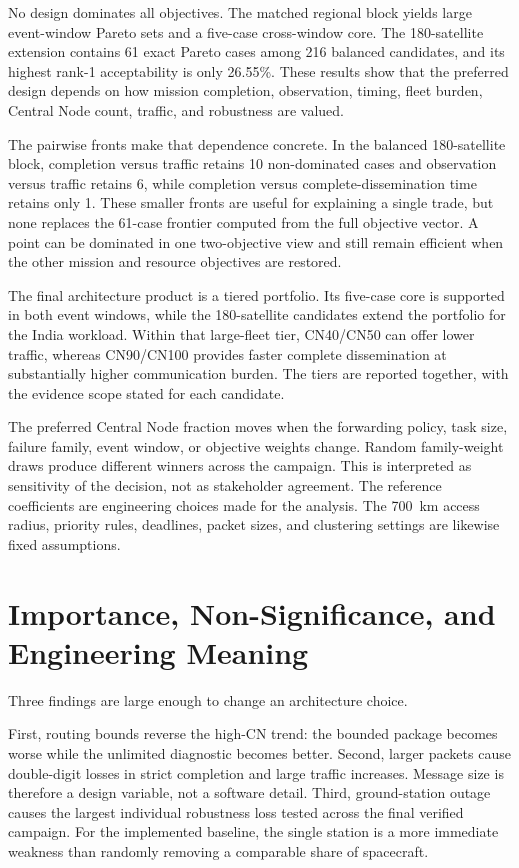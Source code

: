 No design dominates all objectives. The matched regional block yields large event-window Pareto sets and a five-case cross-window core. The 180-satellite extension contains 61 exact Pareto cases among 216 balanced candidates, and its highest rank-1 acceptability is only 26.55\%. These results show that the preferred design depends on how mission completion, observation, timing, fleet burden, Central Node count, traffic, and robustness are valued.

The pairwise fronts make that dependence concrete. In the balanced 180-satellite block, completion versus traffic retains 10 non-dominated cases and observation versus traffic retains 6, while completion versus complete-dissemination time retains only 1. These smaller fronts are useful for explaining a single trade, but none replaces the 61-case frontier computed from the full objective vector. A point can be dominated in one two-objective view and still remain efficient when the other mission and resource objectives are restored.

The final architecture product is a tiered portfolio. Its five-case core is supported in both event windows, while the 180-satellite candidates extend the portfolio for the India workload. Within that large-fleet tier, CN40/CN50 can offer lower traffic, whereas CN90/CN100 provides faster complete dissemination at substantially higher communication burden. The tiers are reported together, with the evidence scope stated for each candidate.

The preferred Central Node fraction moves when the forwarding policy, task size, failure family, event window, or objective weights change. Random family-weight draws produce different winners across the campaign. This is interpreted as sensitivity of the decision, not as stakeholder agreement. The reference coefficients are engineering choices made for the analysis. The \SI{700}{\kilo\metre} access radius, priority rules, deadlines, packet sizes, and clustering settings are likewise fixed assumptions.

\section{Importance, Non-Significance, and Engineering Meaning}

Three findings are large enough to change an architecture choice.

First, routing bounds reverse the high-CN trend: the bounded package becomes worse while the unlimited diagnostic becomes better. Second, larger packets cause double-digit losses in strict completion and large traffic increases. Message size is therefore a design variable, not a software detail. Third, ground-station outage causes the largest individual robustness loss tested across the final verified campaign. For the implemented baseline, the single station is a more immediate weakness than randomly removing a comparable share of spacecraft.

